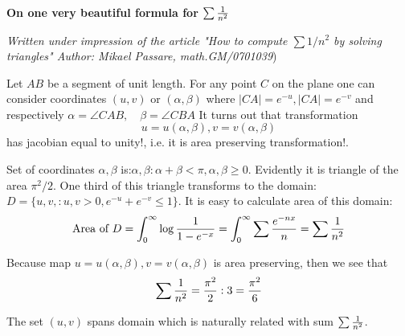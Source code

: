  \centerline {\bf On one very beautiful formula for $\sum {1\over n^2}$}

\medskip
\def\a{\alpha}

  {\it Written under impression of the article
  "How to compute $\sum 1/n^2$ by solving triangles"
    Author: Mikael Passare, math.GM/0701039})

\medskip

  Let $AB$ be a segment of unit length. For any point $C$ on the
  plane one can consider coordinates $(u,v)$ or $(\a,\beta)$ where
  $|CA|=e^{-u}, |CA|=e^{-v}$
 and respectively $\a=\angle CAB,\quad \beta=\angle CBA$
It turns out that transformation
      $$
  u=u(\a,\beta), v=v(\a,\beta)
      $$
has jacobian equal to unity!, i.e. it is area preserving transformation!.

\medskip

Set of coordinates $\a,\beta$ is:$\a,\beta\colon \a+\beta< \pi, \a,\beta\geq 0$.
Evidently it is triangle of the area $\pi^2/2$.
One third of this triangle transforms to the domain:$D=\{u,v,\colon u,v>0, e^{-u}+e^{-v}\leq 1\}$.
It is easy to calculate area of this domain:
         $$
     \hbox{Area of $D$}=\int_0^\infty \log{1\over 1-e^{-x}}=\int_0^\infty\sum {e^{-nx}\over n}=\sum {1\over n^2}
         $$

Because map $u=u(\a,\beta), v=v(\a,\beta)$ is area preserving, then
  we see that
          $$
   \sum {1\over n^2}={\pi^2\over 2}:3={\pi^2\over 6}
          $$

\bye

The set $(u,v)$ spans domain which is naturally related
 with sum $\sum {1\over n^2}$.
